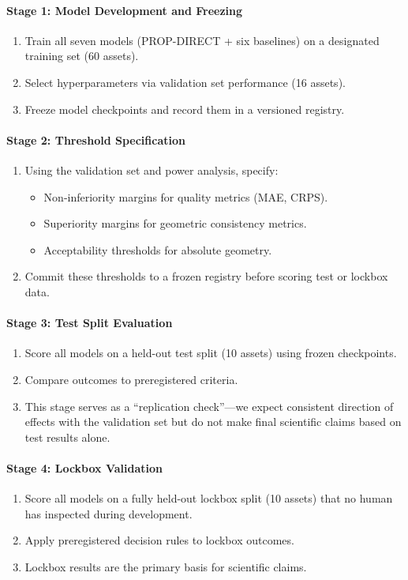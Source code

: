 \paragraph{Stage 1: Model Development and Freezing}
\begin{enumerate}
    \item Train all seven models (PROP-DIRECT + six baselines) on a designated training set (60 assets).
    \item Select hyperparameters via validation set performance (16 assets).
    \item Freeze model checkpoints and record them in a versioned registry.
\end{enumerate}

\paragraph{Stage 2: Threshold Specification}
\begin{enumerate}
    \item Using the validation set and power analysis, specify:
    \begin{itemize}
        \item Non-inferiority margins for quality metrics (MAE, CRPS).
        \item Superiority margins for geometric consistency metrics.
        \item Acceptability thresholds for absolute geometry.
    \end{itemize}
    \item Commit these thresholds to a frozen registry before scoring test or lockbox data.
\end{enumerate}

\paragraph{Stage 3: Test Split Evaluation}
\begin{enumerate}
    \item Score all models on a held-out test split (10 assets) using frozen checkpoints.
    \item Compare outcomes to preregistered criteria.
    \item This stage serves as a ``replication check''—we expect consistent direction of effects with the validation set but do not make final scientific claims based on test results alone.
\end{enumerate}

\paragraph{Stage 4: Lockbox Validation}
\begin{enumerate}
    \item Score all models on a fully held-out lockbox split (10 assets) that no human has inspected during development.
    \item Apply preregistered decision rules to lockbox outcomes.
    \item Lockbox results are the primary basis for scientific claims.
\end{enumerate}

